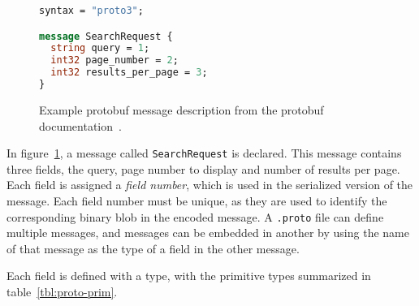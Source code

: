 \documentclass[11pt]{article}
\theoremstyle{definition}
\theoremstyle{plain}
\begin{document}
\begin{figure}[H]
	\begin{lstlisting}[language=proto]
syntax = "proto3";

message SearchRequest {
  string query = 1;
  int32 page_number = 2;
  int32 results_per_page = 3;
}\end{lstlisting}

	\caption{Example protobuf message description from the protobuf documentation~\cite{LanguageGuideProto}.}
	\label{fig:proto-ex}
\end{figure}

In figure~\ref{fig:proto-ex}, a message called \texttt{SearchRequest} is
declared. This message contains three fields, the query, page number to display
and number of results per page. Each field is assigned a \emph{field number},
which is used in the serialized version of the message. Each field number must
be unique, as they are used to identify the corresponding binary blob in the
encoded message. A \texttt{.proto} file can define multiple messages, and
messages can be embedded in another by using the name of that message as the
type of a field in the other message.

Each field is defined with a type, with the primitive types summarized in
table~\ref{tbl:proto-prim}.
\end{document}
